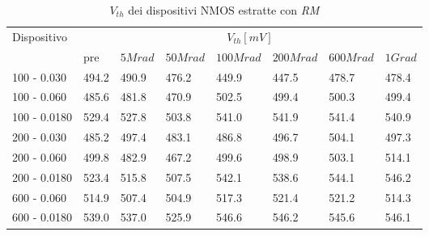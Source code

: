 \documentclass[
	a4paper,
	cleardoublepage=empty,
	headings=twolinechapter,
	numbers=autoenddot,
]{scrbook}
\begin{document}
\begin{table}[H]
  \renewcommand{\arraystretch}{1.3}
  \begin{tabular}{m{2.1cm} m{0.8cm} m{1.1cm} m{1.3cm} m{1.5cm} m{1.5cm} m{1.5cm} m{1cm}}
    \toprule
    \multirow{2}{*}{Dispositivo} & \multicolumn{7}{c}{$V_{th} [mV] $}                                                                    \\
    \cmidrule{2-8}
                                 & pre                                & $5Mrad$ & $50Mrad$ & $100Mrad$ & $200Mrad$ & $600Mrad$ & $1Grad$ \\
    \midrule
    100 - 0.030                     & 494.2                              & 490.9   & 476.2    & 449.9     & 447.5     & 478.7     & 478.4        \\
    \hline
    100 - 0.060                     & 485.6                              & 481.8   & 470.9    & 502.5     & 499.4     & 500.3     & 499.4        \\
    \hline
    100 - 0.0180                    & 529.4                              & 527.8   & 503.8    & 541.0     & 541.9     & 541.4     & 540.9        \\
    \hline
    200 - 0.030                     & 485.2                              & 497.4   & 483.1    & 486.8     & 496.7     & 504.1     & 497.3        \\
    \hline
    200 - 0.060                     & 499.8                              & 482.9   & 467.2    & 499.6     & 498.9     & 503.1     & 514.1        \\
    \hline
    200 - 0.0180                    & 523.4                              & 515.8   & 507.5    & 542.1     & 538.6     & 544.1     & 546.2        \\
    \hline
    600 - 0.060                     & 514.9                              & 507.4   & 504.9    & 517.3     & 521.4     & 521.2     & 514.3        \\
    \hline
    600 - 0.0180                    & 539.0                              & 537.0   & 525.9    & 546.6     & 546.2     & 545.6     & 546.1        \\
    \bottomrule
  \end{tabular}
  \caption{$V_{th}$ dei dispositivi NMOS estratte con \emph{RM}}
  \label{tab:VthRMN}
\end{table}
\end{document}
